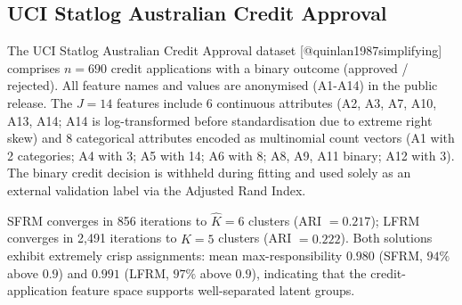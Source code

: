 \documentclass[
  letterpaper,
  DIV=11,
  numbers=noendperiod]{scrartcl}
\begin{document}
\subsection{UCI Statlog Australian Credit
Approval}\label{sec-australian}

The UCI Statlog Australian Credit Approval dataset
{[}@quinlan1987simplifying{]} comprises \(n = 690\) credit applications
with a binary outcome (approved / rejected). All feature names and
values are anonymised (A1-A14) in the public release. The \(J = 14\)
features include 6 continuous attributes (A2, A3, A7, A10, A13, A14; A14
is log-transformed before standardisation due to extreme right skew) and
8 categorical attributes encoded as multinomial count vectors (A1 with 2
categories; A4 with 3; A5 with 14; A6 with 8; A8, A9, A11 binary; A12
with 3). The binary credit decision is withheld during fitting and used
solely as an external validation label via the Adjusted Rand Index.

SFRM converges in 856 iterations to \(\widehat{K} = 6\) clusters (ARI
\(= 0.217\)); LFRM converges in 2,491 iterations to \(\widehat{K} = 5\)
clusters (ARI \(= 0.222\)). Both solutions exhibit extremely crisp
assignments: mean max-responsibility \(0.980\) (SFRM, \(94\%\) above
\(0.9\)) and \(0.991\) (LFRM, \(97\%\) above \(0.9\)), indicating that
the credit-application feature space supports well-separated latent
groups.
\end{document}

